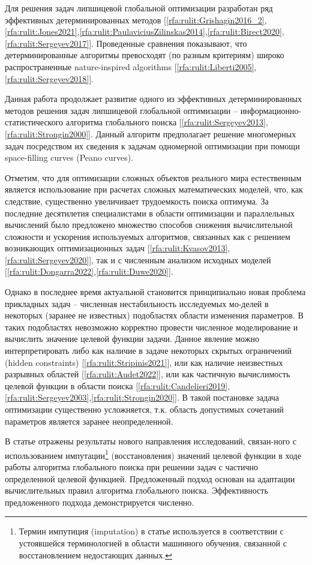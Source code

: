 \documentclass[10pt,a4paper]{book}
\begin{document}
Для решения задач липшицевой глобальной оптимизации разработан ряд эффективных детерминированных методов 
[\ref{rfa:rulit:Grishagin2016_2},\ref{rfa:rulit:Jones2021},\ref{rfa:rulit:PaulaviciusZilinskas2014},\ref{rfa:rulit:Birect2020},\ref{rfa:rulit:Sergeyev2017}]. Проведенные сравнения показывают, что детерминированные алгоритмы превосходят (по разным критериям) широко распространенные nature-inspired algorithms [\ref{rfa:rulit:Liberti2005},\ref{rfa:rulit:Sergeyev2018}].

Данная работа продолжает развитие одного из эффективных детерминированных методов решения задач липшицевой глобальной оптимизации – информационно-статистического алгоритма глобального поиска [\ref{rfa:rulit:Sergeyev2013},\ref{rfa:rulit:Strongin2000}]. Данный алгоритм предполагает решение многомерных задач посредством их сведения к задачам одномерной оптимизации при помощи space-filling curves (Peano curves). 

Отметим, что для оптимизации сложных объектов реального мира естественным является использование при расчетах сложных математических моделей, что, как следствие, существенно увеличивает трудоемкость поиска оптимума. За последние десятилетия специалистами в области оптимизации и параллельных вычислений было предложено множество способов снижения вычислительной сложности и ускорения используемых алгоритмов, связанных как с решением возникающих оптимизационных задач [\ref{rfa:rulit:Kvasov2013},\ref{rfa:rulit:Sergeyev2020}], так и с численным анализом исходных моделей [\ref{rfa:rulit:Dongarra2022},\ref{rfa:rulit:Duwe2020}].

Однако в последнее время актуальной становится принципиально новая проблема прикладных задач – численная нестабильность исследуемых мо-делей в некоторых (заранее не известных) подобластях области изменения параметров. В таких подобластях невозможно корректно провести численное моделирование и вычислить значение целевой функции задачи. Данное явление можно интерпретировать либо как наличие в задаче некоторых скрытых ограничений (hidden constraints) [\ref{rfa:rulit:Stripinis2021}], или как наличие неизвестных разрывных областей [\ref{rfa:rulit:Audet2022}], или как частичную вычислимость целевой функции в области поиска [\ref{rfa:rulit:Candelieri2019},\ref{rfa:rulit:Sergeyev2003},\ref{rfa:rulit:Strongin2020}]. В такой постановке задача оптимизации существенно усложняется, т.к. область допустимых сочетаний параметров является заранее неопределенной.

В статье отражены результаты нового направления исследований, связан-ного с использованием импутации\footnote{Термин импутиция (imputation) в статье используется в соответствии с устоявшейся терминологией в области машинного обучения, связанной с восстановлением недостающих данных.} (восстановления) значений целевой функции в ходе работы алгоритма глобального поиска при решении задач с частично определенной целевой функцией. Предложенный подход основан на адаптации вычислительных правил алгоритма глобального поиска. Эффективность предложенного подхода демонстрируется численно.
\end{document}
